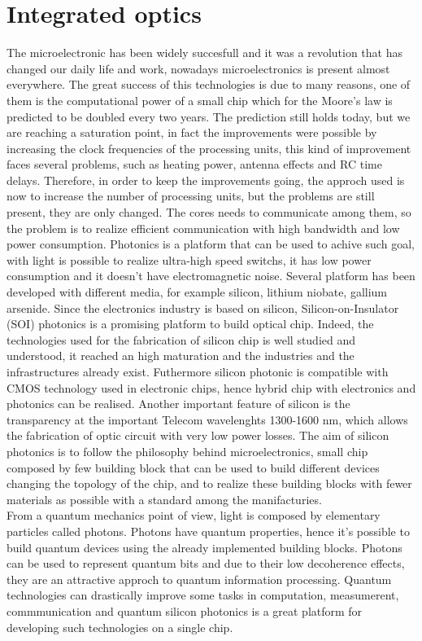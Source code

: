 \section{Integrated optics}
The microelectronic has been widely succesfull and it was a revolution that has changed our daily life and work, nowadays microelectronics is present almost everywhere. The great success of this technologies is due to many reasons, one of them is the computational power of a small chip which for the Moore's law is predicted to be doubled every two years. The prediction still holds today, but we are reaching a saturation point, in fact the improvements were possible by increasing the clock frequencies of the processing units, this kind of improvement faces several problems, such as heating power, antenna effects and RC time delays. Therefore, in order to keep the improvements going, the approch used is now to increase the number of processing units, but the problems are still present, they are only changed. The cores needs to communicate among them, so the problem is to realize efficient communication with high bandwidth and low power consumption. Photonics is a platform that can be used to achive such goal, with light is possible to realize ultra-high speed switchs, it has low power consumption and it doesn't have electromagnetic noise. Several platform has been developed with different media, for example silicon, lithium niobate, gallium arsenide. Since the electronics industry is based on silicon, Silicon-on-Insulator (SOI) photonics is a promising platform to build optical chip. Indeed, the technologies used for the fabrication of silicon chip is well studied and understood, it reached an high maturation and the industries and the infrastructures already exist. Futhermore silicon photonic is compatible with CMOS technology used in electronic chips, hence hybrid chip with electronics and photonics can be realised. Another important feature of silicon is the transparency at the important Telecom wavelenghts 1300-1600 nm, which allows the fabrication of optic circuit with very low power losses. The aim of silicon photonics is to follow the philosophy behind microelectronics, small chip composed by few building block that can be used to build different devices changing the topology of the chip, and to realize these building blocks with fewer materials as possible with a standard among the manifacturies.\\
From a quantum mechanics point of view, light is composed by elementary particles called photons. Photons have quantum properties, hence it's possible to build quantum devices using the already implemented building blocks. Photons can be used to represent quantum bits and due to their low decoherence effects, they are an attractive approch to quantum information processing. Quantum technologies can drastically improve some tasks in computation, measumerent, commmunication and quantum silicon photonics is a great platform for developing such technologies on a single chip. 


